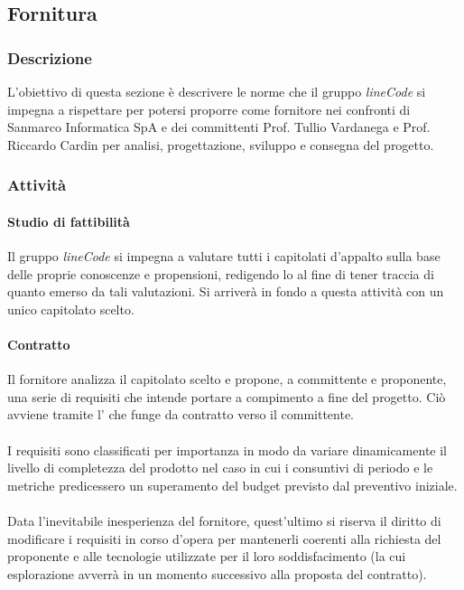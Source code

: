 \subsection{Fornitura}

	\subsubsection{Descrizione}
	L'obiettivo di questa sezione è descrivere le norme che il gruppo \textit{lineCode} si impegna a rispettare per potersi proporre come fornitore nei confronti di Sanmarco Informatica SpA e dei committenti Prof. Tullio Vardanega e Prof. Riccardo Cardin per analisi, progettazione, sviluppo e consegna del progetto.

	\subsubsection{Attività}
		\paragraph{Studio di fattibilità}
            Il gruppo \textit{lineCode} si impegna a valutare tutti i capitolati d'appalto sulla base delle proprie conoscenze e propensioni, redigendo lo  al fine di tener traccia di quanto emerso da tali valutazioni. Si arriverà in fondo a questa attività con un unico capitolato scelto.

        \paragraph{Contratto}
            Il fornitore analizza il capitolato scelto e propone, a committente e proponente, una serie di requisiti che intende portare a compimento a fine del progetto. Ciò avviene tramite l' che funge da contratto verso il committente.
            \\\\
            I requisiti sono classificati per importanza in modo da variare dinamicamente il livello di completezza del prodotto nel caso in cui i consuntivi di periodo e le metriche predicessero un superamento del budget previsto dal preventivo iniziale.
            \\\\
            Data l'inevitabile inesperienza del fornitore, quest'ultimo si riserva il diritto di modificare i requisiti in corso d'opera per mantenerli coerenti alla richiesta del proponente e alle tecnologie utilizzate per il loro soddisfacimento (la cui esplorazione avverrà in un momento successivo alla proposta del contratto).

